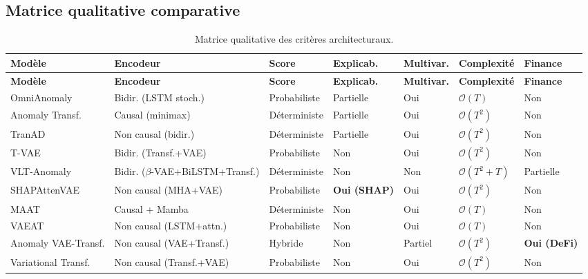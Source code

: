 \documentclass[12pt,a4paper]{article}
\begin{document}
\subsection{Matrice qualitative comparative}

\begin{landscape}
\begin{longtable}{p{3cm}p{2.5cm}p{2.2cm}p{2cm}p{1.8cm}p{2.5cm}p{2.5cm}}
\caption{Matrice qualitative des critères architecturaux.}
\label{tab:qualitative}\\
\toprule
\textbf{Modèle} & \textbf{Encodeur} & \textbf{Score} &
\textbf{Explicab.} & \textbf{Multivar.} &
\textbf{Complexité} & \textbf{Finance} \\
\midrule
\endfirsthead
\toprule
\textbf{Modèle} & \textbf{Encodeur} & \textbf{Score} &
\textbf{Explicab.} & \textbf{Multivar.} &
\textbf{Complexité} & \textbf{Finance} \\
\midrule
\endhead
\bottomrule\endlastfoot
OmniAnomaly & Bidir. (LSTM stoch.) & Probabiliste & Partielle & Oui &
$\mathcal{O}(T)$ & Non \\
\midrule
Anomaly Transf. & Causal (minimax) & Déterministe & Partielle & Oui &
$\mathcal{O}(T^2)$ & Non \\
\midrule
TranAD & Non causal (bidir.) & Déterministe & Partielle & Oui &
$\mathcal{O}(T^2)$ & Non \\
\midrule
T-VAE & Bidir. (Transf.+VAE) & Probabiliste & Non & Oui &
$\mathcal{O}(T^2)$ & Non \\
\midrule
VLT-Anomaly & Bidir. ($\beta$-VAE+BiLSTM+Transf.) & Déterministe & Non & Non &
$\mathcal{O}(T^2{+}T)$ & Partielle \\
\midrule
SHAPAttenVAE & Non causal (MHA+VAE) & Probabiliste & \textbf{Oui (SHAP)} & Oui &
$\mathcal{O}(T^2)$ & Non \\
\midrule
MAAT & Causal + Mamba & Déterministe & Non & Oui &
$\mathcal{O}(T)$ & Non \\
\midrule
VAEAT & Non causal (LSTM+attn.) & Probabiliste & Non & Oui &
$\mathcal{O}(T)$ & Non \\
\midrule
Anomaly VAE-Transf. & Non causal (VAE+Transf.) & Hybride & Non & Partiel &
$\mathcal{O}(T^2)$ & \textbf{Oui (DeFi)} \\
\midrule
Variational Transf. & Non causal (Transf.+VAE) & Probabiliste & Non & Oui &
$\mathcal{O}(T^2)$ & Non \\
\end{longtable}
\end{landscape}
\end{document}
